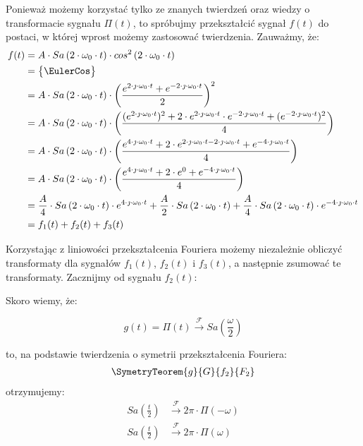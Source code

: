\begin{task}
Ponieważ możemy korzystać tylko ze znanych twierdzeń oraz wiedzy o transformacie sygnału $\Pi(t)$, to spróbujmy przekształcić sygnał $f(t)$ do postaci, w której wprost możemy zastosować twierdzenia. Zauważmy, że:
\begin{align*}
f(t) &= A \cdot Sa\left(2 \cdot \omega_0 \cdot t\right) \cdot cos^2\left(2 \cdot \omega_0 \cdot t\right)\\
&=\begin{Bmatrix}
\EulerCos
\end{Bmatrix}\\
&= A \cdot Sa\left(2 \cdot \omega_0 \cdot t\right) \cdot \left(\frac{e^{2 \cdot \jmath \cdot \omega_0 \cdot t}+e^{-2 \cdot \jmath \cdot \omega_0 \cdot t}}{2}\right)^2\\
&= A \cdot Sa\left(2 \cdot \omega_0 \cdot t\right) \cdot \left(\frac{(e^{2 \cdot \jmath \cdot \omega_0 \cdot t})^2+ 2 \cdot e^{2 \cdot \jmath \cdot \omega_0 \cdot t} \cdot e^{-2 \cdot \jmath \cdot \omega_0 \cdot t}+(e^{-2 \cdot \jmath \cdot \omega_0 \cdot t})^2}{4}\right)\\
&= A \cdot Sa\left(2 \cdot \omega_0 \cdot t\right) \cdot \left(\frac{e^{4 \cdot \jmath \cdot \omega_0 \cdot t}+ 2 \cdot e^{2 \cdot \jmath \cdot \omega_0 \cdot t -2 \cdot \jmath \cdot \omega_0 \cdot t}+e^{-4 \cdot \jmath \cdot \omega_0 \cdot t}}{4}\right)\\
&= A \cdot Sa\left(2 \cdot \omega_0 \cdot t\right) \cdot \left(\frac{e^{4 \cdot \jmath \cdot \omega_0 \cdot t}+ 2 \cdot e^{0}+e^{-4 \cdot \jmath \cdot \omega_0 \cdot t}}{4}\right)\\
&= \frac{A}{4} \cdot Sa\left(2 \cdot \omega_0 \cdot t\right) \cdot e^{4 \cdot \jmath \cdot \omega_0 \cdot t} + \frac{A}{2} \cdot Sa\left(2 \cdot \omega_0 \cdot t\right) +\frac{A}{4} \cdot Sa\left(2 \cdot \omega_0 \cdot t\right) \cdot e^{-4 \cdot \jmath \cdot \omega_0 \cdot t}\\
&= f_1(t)+f_2(t)+f_3(t)
\end{align*}

Korzystając z liniowości przekształcenia Fouriera możemy niezależnie obliczyć transformaty dla sygnałów $f_1(t)$, $f_2(t)$ i $f_3(t)$, a następnie zsumować te transformaty. Zacznijmy od sygnału $f_2(t)$:

Skoro wiemy, że:

\begin{equation}
g(t) = \Pi(t) \xrightarrow{\mathcal F} Sa\left(\frac{\omega}{2}\right)
\end{equation}

to, na podstawie twierdzenia o symetrii przekształcenia Fouriera:
\begin{align*}
\SymetryTeorem{g}{G}{f_2}{F_2}
\end{align*}
otrzymujemy:
\begin{align*}
Sa\left(\frac{t}{2}\right) &\xrightarrow{\mathcal F} 2\pi \cdot \Pi(-\omega)\\
Sa\left(\frac{t}{2}\right) &\xrightarrow{\mathcal F} 2\pi \cdot \Pi(\omega)
\end{align*}


\end{task}
